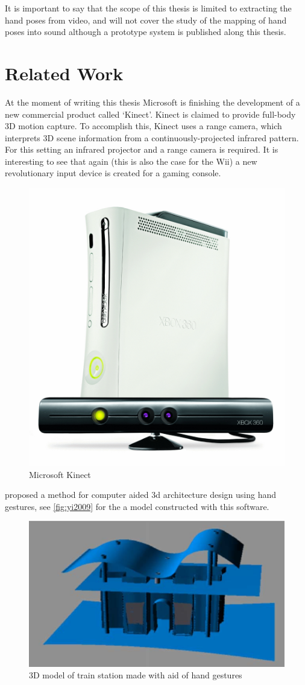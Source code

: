 It is important to say that the scope of this thesis is limited to extracting the hand poses from video, and will not cover the study of the mapping of hand poses into sound although a prototype system is published along this thesis.


\section{Related Work}
At the moment of writing this thesis Microsoft is finishing the development of a new commercial product called `Kinect'. Kinect is claimed to provide full-body 3D motion capture. To accomplish this, Kinect uses a range camera, which interprets 3D scene information from a continuously-projected infrared pattern. For this setting an infrared projector and a range camera is required. It is interesting to see that again (this is also the case for the Wii) a new revolutionary input device is created for a gaming console. 

\begin{figure}[tb]
	\center{}
	\includegraphics[width=0.3\linewidth]{figures/wave.jpg}
	\caption{Microsoft Kinect}
	\label{fig:kinect}
\end{figure}

\citep{Yi2009} proposed a method for computer aided 3d architecture design using hand gestures, see \autoref{fig:yi2009} for the a model constructed with this software.

\begin{figure}[tb]
	\center{}
	\includegraphics[width=0.6\linewidth]{figures/yi2009.png}
	\caption{3D model of train station made with aid of hand gestures}
	\label{fig:yi2009}
\end{figure}

